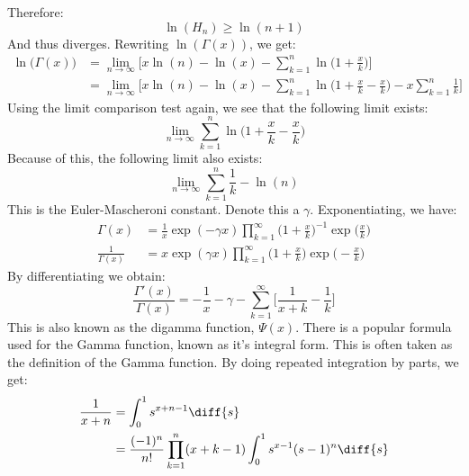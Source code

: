         Therefore:
        \begin{equation}
            \ln(H_{n})\geq\ln(n+1)
        \end{equation}
        And thus diverges. Rewriting $\ln(\Gamma(x))$, we get:
        \begin{align}
            \ln\big(\Gamma(x)\big)
            &=\underset{n\rightarrow\infty}{\lim}\Big[
                x\ln(n)-\ln(x)-\sum_{k=1}^{n}\ln\big(1+\frac{x}{k}\big)\Big]\\
            &=\underset{n\rightarrow\infty}{\lim}\Big[
                x\ln(n)-\ln(x)-\sum_{k=1}^{n}\ln\big(1+\frac{x}{k}-\frac{x}{k}\big)
                -x\sum_{k=1}^{n}\frac{1}{k}\Big]\
        \end{align}
        Using the limit comparison test again, we see that the following limit exists:
        \begin{equation}
            \underset{n\rightarrow\infty}{\lim}
            \sum_{k=1}^{n}\ln\big(1+\frac{x}{k}-\frac{x}{k}\big)
        \end{equation}
        Because of this, the following limit also exists:
        \begin{equation}
            \underset{n\rightarrow\infty}{\lim}
            \sum_{k=1}^{n}\frac{1}{k}-\ln(n)
        \end{equation}
        This is the Euler-Mascheroni constant. Denote this a $\gamma$. Exponentiating,
        we have:
        \begin{align}
            \Gamma(x)&=\frac{1}{x}\exp(-\gamma{x})\prod_{k=1}^{\infty}
                \Big(1+\frac{x}{k}\Big)^{-1}\exp\Big(\frac{x}{k}\Big)\\
            \frac{1}{\Gamma(x)}
            &=x\exp(\gamma{x})\prod_{k=1}^{\infty}
                \Big(1+\frac{x}{k}\Big)\exp\Big(-\frac{x}{k}\Big)
        \end{align}
        By differentiating we obtain:
        \begin{equation}
            \frac{\Gamma'(x)}{\Gamma(x)}=
            \minus\frac{1}{x}-\gamma-\sum_{k=1}^{\infty}
                \Big[\frac{1}{x+k}-\frac{1}{k}\Big]
        \end{equation}
        This is also known as the digamma function, $\Psi(x)$. There is a popular
        formula used for the Gamma function, known as it's integral form. This is
        often taken as the definition of the Gamma function. By doing repeated integration
        by parts, we get:
        \begin{align}
            \frac{1}{x+n}
            &=\int_{0}^{1}s^{x+n-1}\diff{s}\\
            &=\frac{(-1)^{n}}{n!}\prod_{k=1}^{n}(x+k-1)
                \int_{0}^{1}s^{x-1}(s-1)^{n}\diff{s}
        \end{align}
